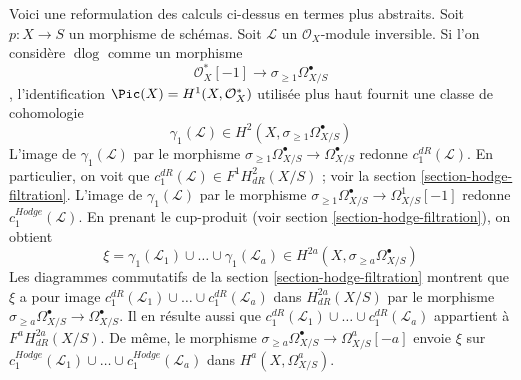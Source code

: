 \begin{remark}
\label{remark-truncations}
Voici une reformulation des calculs ci-dessus en termes plus abstraits.
Soit $p : X \to S$ un morphisme de schémas. Soit $\mathcal{L}$ un
$\mathcal{O}_X$-module inversible. Si l'on considère $\text{d}\log$ comme un morphisme
$$
\mathcal{O}_X^*[-1] \to \sigma_{\geq 1}\Omega^\bullet_{X/S}
$$,
l'identification $\Pic(X) = H^1(X, \mathcal{O}_X^*)$ utilisée plus haut fournit une
classe de cohomologie
$$
\gamma_1(\mathcal{L}) \in H^2(X, \sigma_{\geq 1}\Omega^\bullet_{X/S})
$$
L'image de $\gamma_1(\mathcal{L})$ par le morphisme
$\sigma_{\geq 1}\Omega^\bullet_{X/S} \to \Omega^\bullet_{X/S}$
redonne $c_1^{dR}(\mathcal{L})$. En particulier, on voit que
$c_1^{dR}(\mathcal{L}) \in F^1H^2_{dR}(X/S)$ ; voir la
section \ref{section-hodge-filtration}. L'image de $\gamma_1(\mathcal{L})$
par le morphisme $\sigma_{\geq 1}\Omega^\bullet_{X/S} \to \Omega^1_{X/S}[-1]$
redonne $c_1^{Hodge}(\mathcal{L})$. En prenant le cup-produit
(voir section \ref{section-hodge-filtration}), on obtient
$$
\xi = \gamma_1(\mathcal{L}_1) \cup \ldots \cup \gamma_1(\mathcal{L}_a) \in
H^{2a}(X, \sigma_{\geq a}\Omega^\bullet_{X/S})
$$
Les diagrammes commutatifs de la section \ref{section-hodge-filtration}
montrent que $\xi$ a pour image
$c_1^{dR}(\mathcal{L}_1) \cup \ldots \cup c_1^{dR}(\mathcal{L}_a)$
dans $H^{2a}_{dR}(X/S)$ par le morphisme
$\sigma_{\geq a}\Omega^\bullet_{X/S} \to \Omega^\bullet_{X/S}$.
Il en résulte aussi que
$c_1^{dR}(\mathcal{L}_1) \cup \ldots \cup c_1^{dR}(\mathcal{L}_a)$
appartient à $F^a H^{2a}_{dR}(X/S)$. De même, le morphisme
$\sigma_{\geq a}\Omega^\bullet_{X/S} \to \Omega^a_{X/S}[-a]$
envoie $\xi$ sur
$c_1^{Hodge}(\mathcal{L}_1) \cup \ldots \cup c_1^{Hodge}(\mathcal{L}_a)$
dans $H^a(X, \Omega^a_{X/S})$.
\end{remark}

